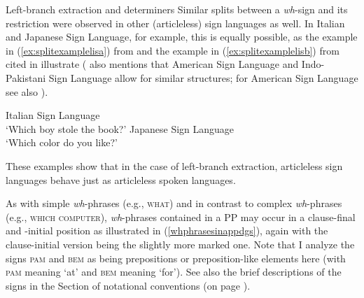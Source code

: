 \begin{digression}{Left-branch extraction and determiners}{}
Similar splits between a \textit{wh}-sign and its restriction were observed in other (articleless) sign languages as well. In Italian and Japanese Sign Language, for example, this is equally possible, as the example in (\ref{ex:splitexamplelisa}) from \citet[285]{cecchetto2009another} and the example in (\ref{ex:splitexamplelisb}) from \citet{fischer1998feature} cited in \citet[25]{zeshan2004interrogative} illustrate (\citealt{zeshan2004interrogative} also mentions that American Sign Language and Indo-Pakistani Sign Language allow for similar structures; for American Sign Language see also \citealt{boster1996quantifier}). 

\begin{exe}
\ex\label{splitexamplelis}\begin{xlist}
\ex Italian Sign Language \\ 
\glt `Which boy stole the book?' \label{ex:splitexamplelisa} 
\ex Japanese Sign Language \\  
\glt `Which color do you like?' \label{ex:splitexamplelisb} 
\end{xlist}
\end{exe} 

\noindent These examples show that in the case of left-branch extraction, articleless sign languages behave just as articleless spoken languages. 
\end{digression}


\noindent As with simple \textit{wh}-phrases (e.g., \textsc{what}) and in contrast to complex \textit{wh}-phrases (e.g., \textsc{which computer}), \textit{wh}-phrases contained in a PP may occur in a clause-final and -initial position as illustrated in (\ref{whphrasesinappdgs}), again with the clause-initial version being the slightly more marked one. Note that I analyze the signs \textsc{pam} and \textsc{bem} as being prepositions or preposition-like elements here (with \textsc{pam} meaning `at' and \textsc{bem} meaning `for'). See also the brief descriptions of the signs in the Section of notational conventions (on page \pageref{notational}).


